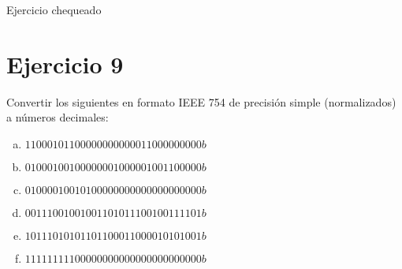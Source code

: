 \documentclass{article}
\begin{document}
{\color{green} Ejercicio chequeado}

\section*{Ejercicio 9}
Convertir los siguientes en formato IEEE 754 de precisión simple (normalizados) a números decimales:
\begin{enumerate}[a)]
    \item $1 1 0 0 0 1 0 1 1 0 0 0 0 0 0 0 0 0 0 0 0 1 1 0 0 0 0 0 0 0 0 0 b$
    \item $0 1 0 0 0 1 0 0 1 0 0 0 0 0 0 0 1 0 0 0 0 0 1 0 0 1 1 0 0 0 0 0 b$
    \item $0 1 0 0 0 0 1 0 0 1 0 1 0 0 0 0 0 0 0 0 0 0 0 0 0 0 0 0 0 0 0 0 b$
    \item $0 0 1 1 1 0 0 1 0 0 1 0 0 1 1 0 1 0 1 1 1 0 0 1 0 0 1 1 1 1 0 1 b$
    \item $1 0 1 1 1 0 1 0 1 0 1 1 0 1 1 0 0 0 1 1 0 0 0 0 1 0 1 0 1 0 0 1 b$
    \item $1 1 1 1 1 1 1 1 1 0 0 0 0 0 0 0 0 0 0 0 0 0 0 0 0 0 0 0 0 0 0 0 b$
\end{enumerate}
\end{document}

